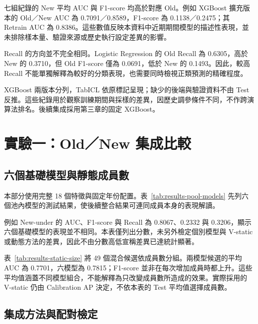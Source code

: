 

七組紀錄的 New 平均 AUC 與 F1-score 均高於對應 Old。例如 XGBoost 擴充版本的 Old／New AUC 為 0.7091／0.8589，F1-score 為 0.1138／0.2475；其 Retrain AUC 為 0.8386。這些數值反映本資料中近期期間模型的描述性表現，並未排除樣本量、驗證來源或歷史執行設定差異的影響。

Recall 的方向並不完全相同。Logistic Regression 的 Old Recall 為 0.6305，高於 New 的 0.3710，但 Old F1-score 僅為 0.0691，低於 New 的 0.1493。因此，較高 Recall 不能單獨解釋為較好的分類表現，也需要同時檢視正類預測的精確程度。

XGBoost 兩版本分列，TabICL 依原標記呈現；缺少的後端與驗證資料不由 Test 反推。這些紀錄用於觀察訓練期間與採樣的差異，因歷史調參條件不同，不作跨演算法排名。後續集成採用第三章的固定 XGBoost。

\section{實驗一：Old／New 集成比較}\label{sec:results-experiment1}

\subsection{六個基礎模型與靜態成員數}

本部分使用完整 18 個特徵與固定年份配置。表~\ref{tab:results-pool-models} 先列六個池內模型的測試結果，使後續整合結果可連同成員本身的表現解讀。



例如 New-under 的 AUC、F1-score 與 Recall 為 0.8067、0.2332 與 0.3206，顯示六個基礎模型的表現並不相同。本表僅列出分數，未另外檢定個別模型與 V-static 或動態方法的差異，因此不由分數高低宣稱差異已達統計顯著。



表~\ref{tab:results-static-size} 將 49 個混合候選依成員數分組。兩模型候選的平均 AUC 為 0.7701，六模型為 0.7815；F1-score 並非在每次增加成員時都上升。這些平均值涵蓋不同模型組合，不能解釋為只改變成員數所造成的效果。實際採用的 V-static 仍由 Calibration AP 決定，不依本表的 Test 平均值選擇成員數。

\subsection{集成方法與配對檢定}

